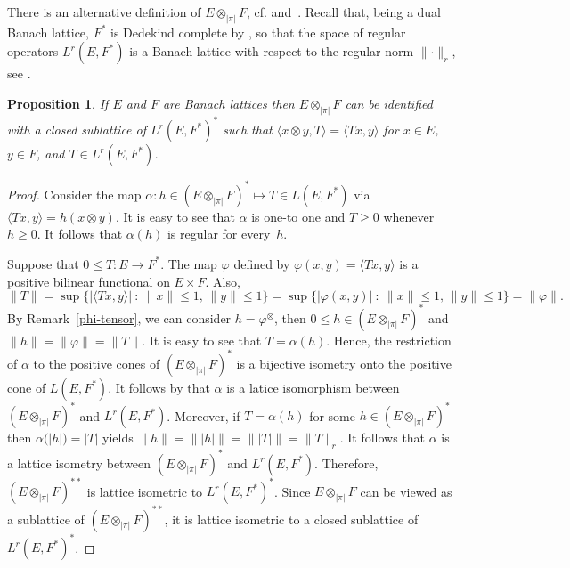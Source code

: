 \documentclass[12pt]{amsart}
\theoremstyle{plain}
\newtheorem{proposition}[theorem]{Proposition}
\theoremstyle{definition}
\newcommand{\abs}[1]{\lvert#1\rvert}
\newcommand{\norm}[1]{\lVert#1\rVert}
\newcommand{\bigabs}[1]{\bigl\lvert#1\bigr\rvert}
\newcommand{\bignorm}[1]{\bigl\lVert#1\bigr\rVert}
\renewcommand{\le}{\leqslant}
\renewcommand{\ge}{\geqslant}
\renewcommand{\mid}{\::\:}
\def\api{{\abs{\!\pi\!}}}
\def\ftp{\otimes_{\!\scriptscriptstyle\api}\!}
\begin{document}
There is an alternative definition of $E\ftp F$, cf.
\cite[1I]{Fremlin:74} and~\cite[pp.~203-204]{Schaefer:80}. Recall that,
being a dual Banach lattice, $F^*$ is Dedekind complete by
\cite[Theorem~3.49]{Aliprantis:06}, so that the space of regular
operators $L^r(E,F^*)$ is a Banach lattice with respect to the regular
norm $\norm{\cdot}_r$, see \cite[p.~255]{Aliprantis:06}.

\begin{proposition}\label{ftp-repr}
  If $E$ and $F$ are Banach lattices then $E\ftp F$ can be identified
  with a closed sublattice of $L^r(E,F^*)^*$ such that $\langle
  x\otimes y, T\rangle=\langle Tx,y\rangle$ for $x\in E$, $y\in F$,
  and $T\in L^r(E,F^*)$.
\end{proposition}

\begin{proof}
  Consider the map $\alpha\colon h\in(E\ftp F)^*\mapsto T\in L(E,F^*)$
  via $\langle Tx,y\rangle=h(x\otimes y)$. It is easy to see that
  $\alpha$ is one-to one and $T\ge 0$ whenever $h\ge 0$. It follows
  that $\alpha(h)$ is regular for every~$h$.

  Suppose that $0\le T\colon E\to F^*$. The map $\varphi$ defined by
  $\varphi(x,y)=\langle Tx,y\rangle$ is a positive bilinear functional
  on $E\times F$. Also,
  \begin{displaymath}
  \norm{T}
  =\sup\bigl\{\bigabs{\langle Tx,y\rangle}\mid
    \norm{x}\le 1,\,\norm{y}\le 1\bigr\}
   =\sup\bigl\{\bigabs{\varphi(x,y)}\mid
    \norm{x}\le 1,\,\norm{y}\le 1\bigr\}
   =\norm{\varphi}. 
  \end{displaymath}
  By Remark~\ref{phi-tensor}, we can consider $h=\varphi^{\otimes}$,
  then $0\le h\in(E\ftp F)^*$ and $\norm{h}=\norm{\varphi}=\norm{T}$.
  It is easy to see that $T=\alpha(h)$. Hence, the restriction of
  $\alpha$ to the positive cones of $(E\ftp F)^*$ is a bijective
  isometry onto the positive cone of $L(E,F^*)$. It follows by
  \cite[Theorem~2.15]{Aliprantis:06} that $\alpha$ is a latice
  isomorphism between $(E\ftp F)^*$ and $L^r(E,F^*)$. Moreover, if
  $T=\alpha(h)$ for some $h\in(E\ftp F)^*$ then
  $\alpha\bigl(\abs{h}\bigr)=\abs{T}$ yields
  \begin{math}
  \norm{h}=\bignorm{\abs{h}}=\bignorm{\abs{T}}=\norm{T}_r. 
  \end{math}
  It follows that $\alpha$ is a lattice isometry between $(E\ftp F)^*$
  and $L^r(E,F^*)$.  Therefore, $(E\ftp F)^{**}$ is lattice isometric to
  $L^r(E,F^*)^*$.  Since $E\ftp F$ can be viewed as a sublattice of
  $(E\ftp F)^{**}$, it is lattice isometric to a closed sublattice of
  $L^r(E,F^*)^*$.
\end{proof}
\end{document}
